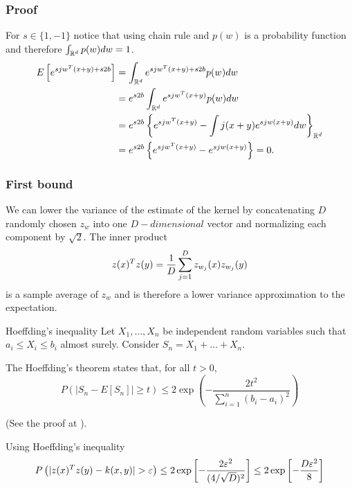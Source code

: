 \begin{frame}
  \frametitle{Proof}

  For $s \in \{1,-1\}$ notice that using chain rule and 
$p(w)$ is a probability function and therefore 
$\int_{\mathbb{R}^d} p(w) dw = 1$.
\begin{align}
    \label{eq:expected_value}
    E\left[ e^{sj w^T(x+y)+s2b}\right]
    & = 
    \int_{\mathbb{R}^d} e^{sj w^T(x+y)+s2b} p(w) dw
    \nonumber
    \\
    \nonumber
    & = 
    e^{s2b}\int_{\mathbb{R}^d} e^{sj w^T(x+y)} p(w) dw
    \\
    \nonumber
    & = 
    e^{s2b}\left\{ 
        e^{sj w^T(x+y)} 
        - 
        \int j(x+y) e^{sj w (x + y)} dw
    \right\}_{\mathbb{R}^d}
    \\
    & = 
    e^{s2b}\left\{ 
        e^{sj w^T(x+y)} 
        - 
         e^{sj w (x + y)} 
    \right\}
    = 0.
\end{align}


\end{frame}


\begin{frame}
  \frametitle{First bound}

  We can lower the variance of the estimate of the kernel by concatenating $D$ randomly chosen $z_w$ into one $D-dimensional$ vector and normalizing each component by 
$\sqrt{2}$.
 The inner product 
 \begin{equation}
    z(x)^T z(y) = \frac{1}{D}\sum_{j=1}^{D} z_{w_j}(x)z_{w_j}(y)
 \end{equation}
 is a sample average of $z_w$ and is therefore a lower variance approximation to the expectation. 

\end{frame}



\begin{frame}

  \begin{theorem}{Hoeffding's inequality}
    Let $X_1, \ldots, X_n$ be independent random variables
    such that $a_i \leq X_i \leq b_i$ almost surely.
    Consider $S_n = X_1 +  \ldots + X_n$.

    The Hoeffding's theorem states that, for all $t>0$,
    \begin{equation}
        P\left(
            |S_n - E[S_n]| \geq t
        \right)
        \leq 
        2 \exp \left(
            - \frac{2 t^2}{\sum_{i=1}^n (b_i -a_i)^2}
        \right)
    \end{equation}
\end{theorem}
(See the proof at \cite{Hoeffding1994}). 

Using Hoeffding's inequality
 \begin{equation}
    \label{eq:firstBound}
    P\left(
        |z(x)^T z(y) - k(x,y)|
        > \varepsilon
    \right)
    \leq 
    2 
    \exp\left[
        - \frac{2\varepsilon^2}{(4/\sqrt{D})^2}
    \right]
    \leq
    2 
    \exp\left[
        - \frac{D\varepsilon^2}{8}
    \right]
 \end{equation}

\end{frame}

